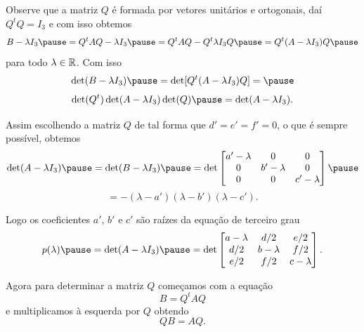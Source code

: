 \documentclass{beamer}
\begin{document}
\begin{frame}
    Observe que a matriz $Q$ \pause é formada por vetores unitários \pause e ortogonais, \pause daí $Q^tQ = I_3$ \pause e com isso obtemos\pause
    \[
        B - \lambda I_3 \pause = Q^t A Q - \lambda I_3 \pause = Q^t A Q - Q^t\lambda I_3 Q \pause = Q^t (A - \lambda I_3)Q\pause
    \]
    para todo $\lambda \in \mathbb{R}$. \pause Com isso\pause
    \[
        \det(B - \lambda I_3) \pause = \det[Q^t(A - \lambda I_3)Q] = \pause
    \]
    \[
        \det(Q^t)\det(A - \lambda I_3)\det(Q) \pause = \det(A - \lambda I_3).
    \]
\end{frame}

\begin{frame}
    Assim escolhendo a matriz $Q$ \pause de tal forma que $d' = e' = f' = 0$, \pause o que é sempre possível, \pause obtemos\pause
    \[
        \det(A - \lambda I_3) \pause = \det(B - \lambda I_3) \pause = \det \begin{bmatrix}
            a' - \lambda & 0            & 0            \\
            0            & b' - \lambda & 0            \\
            0            & 0            & c' - \lambda
        \end{bmatrix} \pause
    \]
    \[
        = -(\lambda - a')(\lambda - b')(\lambda - c').
    \]
\end{frame}

\begin{frame}
    Logo os coeficientes $a'$, $b'$ e $c'$ \pause são raízes da equação de terceiro grau\pause
    \[
        p(\lambda) \pause = \det(A - \lambda I_3) \pause = \det \begin{bmatrix}
            a - \lambda & d/2         & e/2         \\
            d/2         & b - \lambda & f/2         \\
            e/2         & f/2         & c - \lambda
        \end{bmatrix}.
    \]
\end{frame}

\begin{frame}
    Agora para determinar a matriz $Q$ \pause começamos com a equação\pause
    \[
        B = Q^t A Q
    \]\pause
    e multiplicamos à esquerda por $Q$ \pause obtendo\pause
    \[
        Q B = AQ.
    \]
\end{frame}
\end{document}
